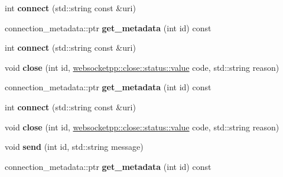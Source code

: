 \begin{DoxyCompactItemize}
\item 
\mbox{\label{classwebsocket__endpoint_a5850523b829e145793d42e137d5eb8c0}} 
int {\bfseries connect} (std\+::string const \&uri)
\item 
\mbox{\label{classwebsocket__endpoint_a5896c27213953d2d33b88e117b1971f6}} 
connection\+\_\+metadata\+::ptr {\bfseries get\+\_\+metadata} (int id) const
\item 
\mbox{\label{classwebsocket__endpoint_a5850523b829e145793d42e137d5eb8c0}} 
int {\bfseries connect} (std\+::string const \&uri)
\item 
\mbox{\label{classwebsocket__endpoint_ac18bcc30c3894c74c9ad028b47c299f9}} 
void {\bfseries close} (int id, \mbox{\hyperlink{namespacewebsocketpp_1_1close_1_1status_a8614a5c4733d708e2d2a32191c5bef84}{websocketpp\+::close\+::status\+::value}} code, std\+::string reason)
\item 
\mbox{\label{classwebsocket__endpoint_a5896c27213953d2d33b88e117b1971f6}} 
connection\+\_\+metadata\+::ptr {\bfseries get\+\_\+metadata} (int id) const
\item 
\mbox{\label{classwebsocket__endpoint_a5850523b829e145793d42e137d5eb8c0}} 
int {\bfseries connect} (std\+::string const \&uri)
\item 
\mbox{\label{classwebsocket__endpoint_ac18bcc30c3894c74c9ad028b47c299f9}} 
void {\bfseries close} (int id, \mbox{\hyperlink{namespacewebsocketpp_1_1close_1_1status_a8614a5c4733d708e2d2a32191c5bef84}{websocketpp\+::close\+::status\+::value}} code, std\+::string reason)
\item 
\mbox{\label{classwebsocket__endpoint_aaae3d15cae0c3d7fd134ca28676e53cc}} 
void {\bfseries send} (int id, std\+::string message)
\item 
\mbox{\label{classwebsocket__endpoint_a5896c27213953d2d33b88e117b1971f6}} 
connection\+\_\+metadata\+::ptr {\bfseries get\+\_\+metadata} (int id) const
\end{DoxyCompactItemize}


